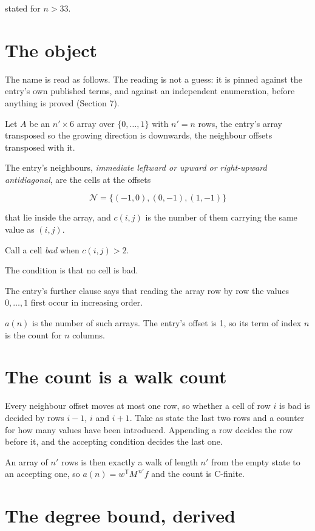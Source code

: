 \documentclass[11pt]{article}
\theoremstyle{definition}
\begin{document}
stated for $n > 33$.

\section{The object}

The name is read as follows. The reading is not a guess: it is pinned against the entry's own published terms, and against an independent enumeration, before anything is proved (Section 7).

Let $A$ be an $n' \times 6$ array over $\{0,\dots,1\}$ with $n' = n$ rows, the entry's array transposed so the growing direction is downwards, the neighbour offsets transposed with it.

The entry's neighbours, {\itshape immediate leftward or upward or right-upward antidiagonal}, are the cells at the offsets

\[\mathcal{N} = \{(-1,0), (0,-1), (1,-1)\}\]

that lie inside the array, and $c(i,j)$ is the number of them carrying the same value as $(i,j)$.

Call a cell {\itshape bad} when $c(i,j) > 2$.

The condition is that no cell is bad.

The entry's further clause says that reading the array row by row the values $0,\dots,1$ first occur in increasing order.

$a(n)$ is the number of such arrays. The entry's offset is 1, so its term of index $n$ is the count for $n$ columns.

\section{The count is a walk count}

Every neighbour offset moves at most one row, so whether a cell of row $i$ is bad is decided by rows $i-1$, $i$ and $i+1$. Take as state the last two rows and a counter for how many values have been introduced. Appending a row decides the row before it, and the accepting condition decides the last one.

An array of $n'$ rows is then exactly a walk of length $n'$ from the empty state to an accepting one, so $a(n) = w^{\mathsf T}M^{\,n'}f$ and the count is C-finite.

\section{The degree bound, derived}
\end{document}
